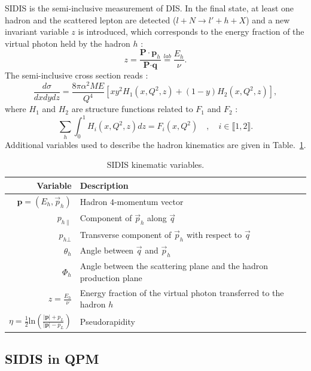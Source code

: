 SIDIS is the semi-inclusive measurement of DIS. In the final state, at least one hadron and the scattered lepton are detected ($l+N \rightarrow l'+h+X$) and a new invariant variable $z$ is introduced, which corresponds to the energy fraction of the virtual photon held by the hadron $h$ :
%
\begin{equation}
  z = \frac{\textbf{P}\cdot\textbf{p}_h}{\textbf{P}\cdot\textbf{q}} \stackrel{lab}{=} \frac{E_h}{\nu}.
  \label{eq:SIDIS}
\end{equation}
%
The semi-inclusive cross section reads \cite{SIDISXS}:
%
\begin{equation}
  \frac{d\sigma}{dxdydz} = \frac{8\pi\alpha^2ME}{Q^4}\left[xy^2H_1(x,Q^2,z)+(1-y)H_2(x,Q^2,z)\right],
  \label{eq:SIDISXS}
\end{equation}
%
where $H_1$ and $H_2$ are structure functions related to $F_1$ and $F_2$ \cite{BERGER,SIDISXS} :
%
\begin{equation}
  \sum\limits_{h}\int_{0}^{1} H_i(x,Q^2,z)dz = F_i(x,Q^2)\quad,\quad i \in  \llbracket1,2\rrbracket.
\end{equation}
%
Additional variables used to describe the hadron kinematics are given in Table.~\ref{tab:SIDIS}.

\begin{table}[h!]
  \caption{SIDIS kinematic variables.}
  \label{tab:SIDIS}
  \begin{tabularx}{\textwidth}{r|lX}
    \hline
    \hline
    Variable & Description \\
    \hline
    \hline
    $\textbf{p}=(E_h,\vec{p}_h)$ & Hadron $4$-momentum vector \\
    $p_{h\|}$ & Component of $\vec{p}_h$ along $\vec{q}$ \\
    $p_{h\bot}$ & Transverse component of $\vec{p}_h$ with respect to $\vec{q}$ \\
    $\theta_h$ & Angle between $\vec{q}$ and $\vec{p}_h$ \\
    $\Phi_h$ & Angle between the scattering plane and the hadron production plane \\
    $z=\frac{E_h}{\nu}$ & Energy fraction of the virtual photon transferred to the hadron $h$ \\
    $\eta=\frac{1}{2}\text{ln}\left(\frac{|\mathbf{p}|+p_L}{|\mathbf{p}|-p_L} \right)$ & Pseudorapidity \\
    \hline
    \hline
  \end{tabularx}
\end{table}

\subsection{SIDIS in QPM}

